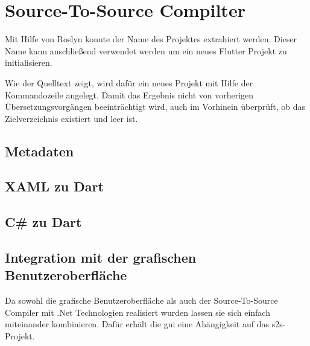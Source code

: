 \section{Source-To-Source Compilter}
Mit Hilfe von Roslyn konnte der Name des Projektes extrahiert werden.  Dieser Name kann anschließend verwendet werden um ein neues Flutter Projekt zu initialisieren.  

Wie der Quelltext zeigt,  wird dafür ein neues Projekt mit Hilfe der Kommandozeile angelegt.  Damit das Ergebnis nicht von vorherigen Übersetzungsvorgängen beeinträchtigt wird,  auch im Vorhinein überprüft,  ob das Zielverzeichnis existiert und leer ist. 

\subsection{Metadaten}


\subsection{XAML zu Dart}

\subsection{C\# zu Dart}

\subsection{Integration mit der grafischen Benutzeroberfläche}

Da sowohl die grafische Benutzeroberfläche als auch der Source-To-Source Compiler mit .Net Technologien realisiert wurden lassen sie sich einfach miteinander kombinieren.  Dafür erhält die  \ac{gui} eine Ahängigkeit auf das \ac{s2s}-Projekt.  
